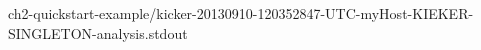 \setTextListing

{ch2-quickstart-example/kicker-20130910-120352847-UTC-myHost-KIEKER-SINGLETON-analysis.stdout}